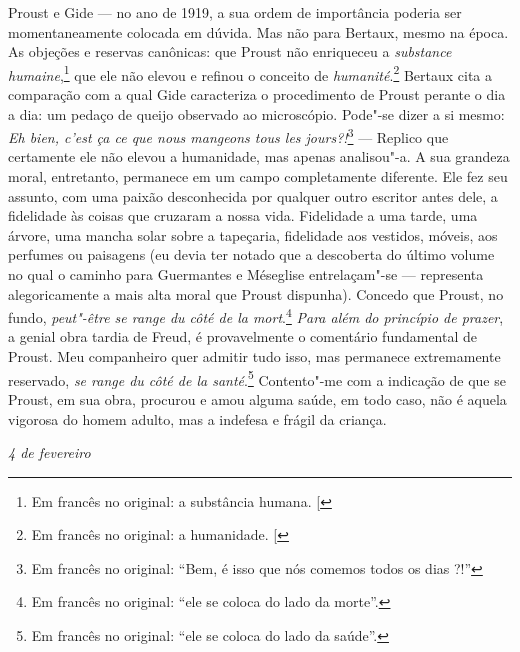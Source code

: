 Proust e Gide --- no ano de 1919, a sua ordem de importância poderia ser
momentaneamente colocada em dúvida. Mas não para Bertaux, mesmo na
época. As objeções e reservas canônicas: que Proust não enriqueceu a
\emph{substance humaine},\footnote{Em francês no original: a substância humana. {[}\versal{N.~T.}{]}} que ele não elevou e refinou o conceito de
\emph{humanité}.\footnote{Em francês no original: a humanidade. {[}\versal{N.~T.}{]}} Bertaux cita a comparação com a qual Gide caracteriza o
procedimento de Proust perante o dia a dia: um pedaço de queijo
observado ao microscópio. Pode"-se dizer a si mesmo: \emph{Eh bien, c'est
ça ce que nous mangeons tous les jours?!}\footnote{Em francês no original: ``Bem, é isso
  que nós comemos todos os dias ?!'' \versal{[N.~T.]}} --- Replico
que certamente ele não elevou a humanidade, mas apenas analisou"-a. A sua
grandeza moral, entretanto, permanece em um campo completamente
diferente. Ele fez seu assunto, com uma paixão desconhecida por qualquer
outro escritor antes dele, a fidelidade às coisas que cruzaram a nossa
vida. Fidelidade a uma tarde, uma árvore, uma mancha solar sobre a
tapeçaria, fidelidade aos vestidos, móveis, aos perfumes ou paisagens
(eu devia ter notado que a descoberta do último volume no qual o caminho
para Guermantes e Méseglise entrelaçam"-se --- representa alegoricamente a
mais alta moral que Proust dispunha). Concedo que Proust, no fundo,
\emph{peut"-être se range du côté de la mort}.\footnote{Em francês no original: ``ele se
  coloca do lado da morte''. \versal{[N.~T.]}} \emph{Para além
do princípio de prazer}, a genial obra tardia de Freud, é provavelmente
o comentário fundamental de Proust. Meu companheiro quer admitir tudo
isso, mas permanece extremamente reservado, \emph{se range du côté de la
santé}.\footnote{Em francês no original: ``ele se coloca do lado da
  saúde''. \versal{[N.~T.]}} Contento"-me com a indicação de que
se Proust, em sua obra, procurou e amou alguma saúde, em todo caso,
não é aquela vigorosa do homem adulto, mas a indefesa e frágil da
criança.

\begin{flushright}
\emph{4 de fevereiro}
\end{flushright}

